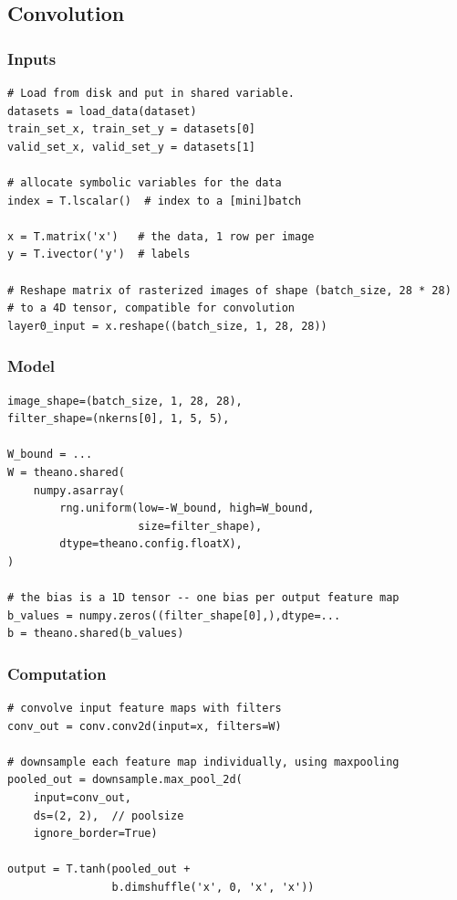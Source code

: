 \documentclass[utf8x,xcolor=pdftex,dvipsnames,table]{beamer}
\begin{document}
\subsection{Convolution}
\begin{frame}
  \tableofcontents[currentsection]
\end{frame}
\begin{frame}[fragile]
  \frametitle{Inputs}
\begin{lstlisting}
# Load from disk and put in shared variable.
datasets = load_data(dataset)
train_set_x, train_set_y = datasets[0]
valid_set_x, valid_set_y = datasets[1]

# allocate symbolic variables for the data
index = T.lscalar()  # index to a [mini]batch

x = T.matrix('x')   # the data, 1 row per image
y = T.ivector('y')  # labels

# Reshape matrix of rasterized images of shape (batch_size, 28 * 28)
# to a 4D tensor, compatible for convolution
layer0_input = x.reshape((batch_size, 1, 28, 28))
\end{lstlisting}
\end{frame}


\begin{frame}[fragile]
  \frametitle{Model}
\begin{lstlisting}
image_shape=(batch_size, 1, 28, 28),
filter_shape=(nkerns[0], 1, 5, 5),

W_bound = ...
W = theano.shared(
    numpy.asarray(
        rng.uniform(low=-W_bound, high=W_bound,
                    size=filter_shape),
        dtype=theano.config.floatX),
)

# the bias is a 1D tensor -- one bias per output feature map
b_values = numpy.zeros((filter_shape[0],),dtype=...
b = theano.shared(b_values)
\end{lstlisting}
\end{frame}


\begin{frame}[fragile]
  \frametitle{Computation}
\begin{lstlisting}
# convolve input feature maps with filters
conv_out = conv.conv2d(input=x, filters=W)

# downsample each feature map individually, using maxpooling
pooled_out = downsample.max_pool_2d(
    input=conv_out,
    ds=(2, 2),  // poolsize
    ignore_border=True)

output = T.tanh(pooled_out +
                b.dimshuffle('x', 0, 'x', 'x'))
\end{lstlisting}
\end{frame}
\end{document}
